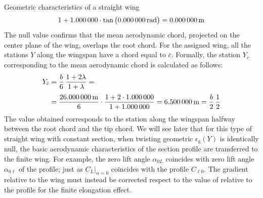 \documentclass[[12pt,twoside]{book}
\begin{document}
\begin{myExampleX}{Geometric characteristics of a straight wing}{}
\[\begin{split}
{      }{
        1 + \SI[round-precision=0]{\myTaperRatioWing}{}
      }
      \cdot \tan \big( \SI[round-precision=0]{\myLambdaLERad}{\radian} \big)
    = { \SI[round-precision=0]{\myXLEMACWingMT}{\metre} }%
\end{split}
\]
The null value confirms that the mean aerodynamic chord, projected on the center plane of the wing, overlaps the root chord.
\noindent
For the assigned wing, all the stations $Y$ along the wingspan have a chord equal to $\bar{c}$. Formally, the station $Y_{\bar{c}}$ corresponding to the mean aerodynamic chord is calculated as follows:
\[
\begin{split}
Y_{\bar{c}} 
  & {}=
    \frac{b}{6} \, \frac{1+2\lambda}{1+\lambda} = \\[3pt]
  & {}=
    \frac{\SI[round-precision=0]{\mySpanWingMT}{\metre}}{6}
      \cdot 
      \frac{
        1 + 2\cdot\SI[round-precision=2]{\myTaperRatioWing}{}
      }{
        1 + \SI[round-precision=2]{\myTaperRatioWing}{}
      }
    = { \SI[round-precision=2]{\myYMACWingMT}{\metre} }
    = \frac{b}{2} \, \frac{1}{2}
\end{split}
\]
The value obtained corresponds to the station along the wingspan halfway between the root chord and the tip chord. We will see later that for this type of straight wing with constant section, when twisting geometric $\epsilon_\mathrm{g}(Y)$ is identically null, the basic aerodynamic characteristics of the section profile are transferred to the finite wing. For example, the zero lift angle $\alpha_{0L}$ coincides with  zero lift angle $\alpha_{0\ell}$ of the profile; just as $C_L \big|_{\alpha = 0} $ coincides with the profile $C_{\ell 0}$. The gradient  relative to the wing must instead be corrected respect to the value of  relative to the profile for the finite elongation effect.
\end{myExampleX}
\end{document}
